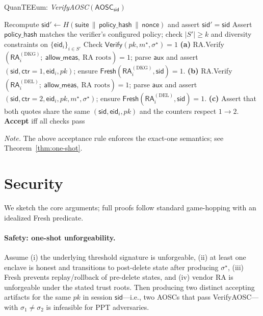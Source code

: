 \documentclass[runningheads,orivec]{llncs}
\newcommand{\prot}{\textsf{QuanTEEum}}
\newcommand{\sid}{\mathsf{sid}}
\begin{document}
\begin{algorithm}[H]
\caption{\prot{}: \emph{VerifyAOSC}$(\mathsf{AOSC}_\sid)$}
\label{alg:verify-aosc}
\begin{small}
\begin{algorithmic}[1]
\State Recompute $\sid' \gets H(\mathsf{suite}\,\|\,\mathsf{policy\_hash}\,\|\,\mathsf{nonce})$ and assert $\sid'=\sid$
\State Assert $\mathsf{policy\_hash}$ matches the verifier’s configured policy; check $|S'|\ge k$ and diversity constraints on $\{\mathsf{eid}_i\}_{i\in S'}$
\State Check $\mathsf{Verify}(pk,m^{\star},\sigma^{\star})=1$
  \State \textbf{(a)} \textsf{RA.Verify}$(\mathsf{RA}^{(\mathrm{DKG})}_i;\ \textsf{allow\_meas},\ \text{RA roots})=1$; parse $\mathsf{aux}$ and assert $(\sid,\mathsf{ctr}{=}1,\mathsf{eid}_i,pk)$; ensure $\textsf{Fresh}(\mathsf{RA}^{(\mathrm{DKG})}_i,\sid)=1$.
  \State \textbf{(b)} \textsf{RA.Verify}$(\mathsf{RA}^{(\mathrm{DEL})}_i;\ \textsf{allow\_meas},\ \text{RA roots})=1$; parse $\mathsf{aux}$ and assert $(\sid,\mathsf{ctr}{=}2,\mathsf{eid}_i,pk,m^{\star},\sigma^{\star})$; ensure $\textsf{Fresh}(\mathsf{RA}^{(\mathrm{DEL})}_i,\sid)=1$.
  \State \textbf{(c)} Assert that both quotes share the same $(\sid,\mathsf{eid}_i,pk)$ and the counters respect $1\!\rightarrow\!2$.
\EndFor
\State \textbf{Accept} iff all checks pass
\end{algorithmic}
\end{small}
\end{algorithm}

\FloatBarrier

\noindent\emph{Note.} The above acceptance rule enforces the exact-one semantics; see Theorem~\ref{thm:one-shot}.

\section{Security}\label{sec:security}
We sketch the core arguments; full proofs follow standard game-hopping with an idealized \textsf{Fresh} predicate.
\paragraph{Safety: one-shot unforgeability.}
\begin{theorem}\label{thm:one-shot}
Assume (i) the underlying threshold signature is unforgeable, (ii) at least one enclave is honest and transitions to post-delete state after producing $\sigma^{\star}$, (iii) \textsf{Fresh} prevents replay/rollback of pre-delete states, and (iv) vendor RA is unforgeable under the stated trust roots. Then producing two distinct accepting artifacts for the same $pk$ in session $\mathsf{sid}$—i.e., two AOSCs that pass \textsf{VerifyAOSC}—with $\sigma_1 \neq \sigma_2$ is infeasible for PPT adversaries.
\end{theorem}
\end{document}
